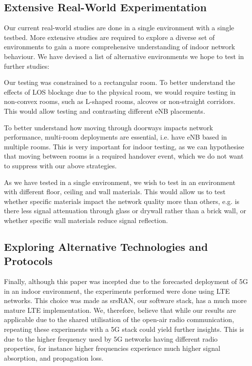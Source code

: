 \subsection{Extensive Real-World Experimentation}
Our current real-world studies are done in a single environment with a single testbed. More extensive studies are required to explore a diverse set of environments to gain a more comprehensive understanding of indoor network behaviour. We have devised a list of alternative environments we hope to test in further studies:
\begin{description}[style=unboxed]
    \item[\textbf{Non-convex Rooms}] Our testing was constrained to a rectangular room. To better understand the effects of LOS blockage due to the physical room, we would require testing in non-convex rooms, such as L-shaped rooms, alcoves or non-straight corridors. This would allow testing and contrasting different eNB placements.
    \item[\textbf{Multi-room Deployments}] To better understand how moving through doorways impacts network performance, multi-room deployments are essential, i.e. have eNB based in multiple rooms. This is very important for indoor testing, as we can hypothesise that moving between rooms is a required handover event, which we do not want to suppress with our above strategies.
    \item[\textbf{Material Impact}] As we have tested in a single environment, we wish to test in an environment with different floor, ceiling and wall materials. This would allow us to test whether specific materials impact the network quality more than others, e.g. is there less signal attenuation through glass or drywall rather than a brick wall, or whether specific wall materials reduce signal reflection.
\end{description}

\subsection{Exploring Alternative Technologies and Protocols}
Finally, although this paper was incepted due to the forecasted deployment of 5G in an indoor environment, the experiments performed were done using LTE networks. This choice was made as srsRAN, our software stack, has a much more mature LTE implementation. We, therefore, believe that while our results are applicable due to the shared utilisation of the open-air radio communication, repeating these experiments with a 5G stack could yield further insights. This is due to the higher frequency used by 5G networks having different radio properties, for instance higher frequencies experience much higher signal absorption, and propagation loss.

